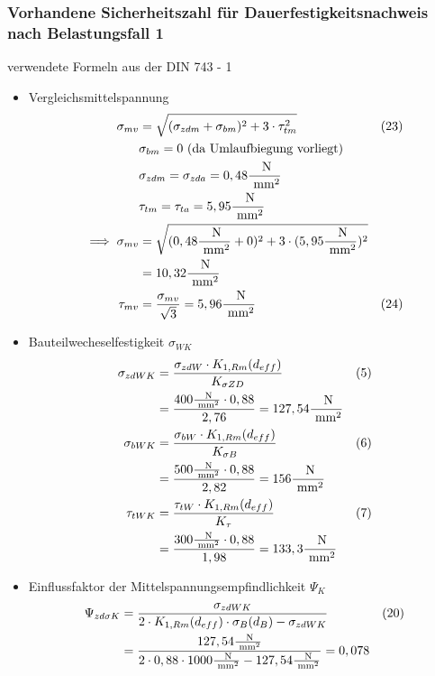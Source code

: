 \subsubsection{Vorhandene Sicherheitszahl für Dauerfestigkeitsnachweis nach Belastungsfall 1 }
verwendete Formeln aus der DIN 743 - 1
\begin{itemize}
	\item Vergleichsmittelspannung 
	\begin{align*}
	\sigma_{mv}&= \sqrt{(\sigma_{zdm} +\sigma_{bm} )^2+ 3 \cdot \tau_{tm}^2 } & (23) \\
	&\sigma_{bm}= 0 \text{ (da Umlaufbiegung vorliegt)} \\
	&\sigma_{zdm} = \sigma_{zda} = 0,48\frac{\text{ N}}{\text{ mm}^2} \\
	&\tau_{tm} = \tau_{ta} = 5,95 \frac{\text{ N}}{\text{ mm}^2} \\
	\implies \sigma_{mv}&= \sqrt{(0,48 \frac{\text{ N}}{\text{ mm}^2} +0 )^2+ 3 \cdot (5,95 \frac{\text{ N}}{\text{ mm}^2})^2 }  \\
	&= 10,32 \frac{\text{ N}}{\text{ mm}^2} \\
	\tau_{mv} &= \frac{\sigma_{mv}}{\sqrt{3}} = 5,96 \frac{\text{ N}}{\text{ mm}^2} & (24)
	\end{align*}
	\item Bauteilwecheselfestigkeit $\sigma_{WK}$ 
	\begin{align*}
	\sigma_{zdWK}&= \frac{\sigma_{zdW} \cdot K_{1,Rm} (d_{eff})}{K_{\sigma ZD}}  & (5)\\
	&=  \frac{400 \frac{\text{ N}}{\text{ mm}^2}\cdot 0,88}{2,76} = 127,54 \frac{\text{ N}}{\text{ mm}^2}\\
	\sigma_{bWK}&= \frac{\sigma_{bW} \cdot K_{1,Rm} (d_{eff})}{K_{\sigma B}}  & (6 )\\
	&=  \frac{500 \frac{\text{ N}}{\text{ mm}^2}\cdot 0,88}{2,82} = 156 \frac{\text{ N}}{\text{ mm}^2}\\
	\tau_{tWK}&= \frac{\tau_{tW} \cdot K_{1,Rm} (d_{eff})}{K_{\tau}} &(7) \\
	&=  \frac{300 \frac{\text{ N}}{\text{ mm}^2}\cdot 0,88}{1,98} = 133,3 \frac{\text{ N}}{\text{ mm}^2}
	\end{align*}
	\item Einflussfaktor der Mittelspannungsempfindlichkeit $\Psi_{K}$ 
	\begin{align*}
	\Psi_{zd \sigma K}&= \frac{\sigma_{zdWK}}{2 \x  K_{1,Rm} (d_{eff}) \x \sigma_B (d_B) -\sigma_{zdWK}}  &(20)\\
	&=  \frac{127,54 \frac{\text{ N}}{\text{ mm}^2}}{2 \x 0,88 \x 1000\frac{\text{ N}}{\text{ mm}^2} - 127,54 \frac{\text{ N}}{\text{ mm}^2}} = 0,078 \\

\end{align*}
\end{itemize}
